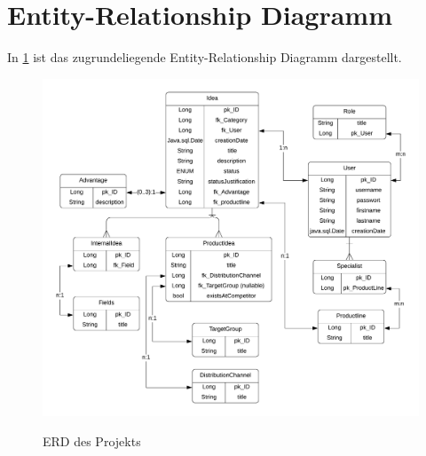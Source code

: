 

\section{Entity-Relationship Diagramm}

In \cref{fig:erd} ist das zugrundeliegende Entity-Relationship Diagramm dargestellt.

\begin{figure}[h!!]
    \centering
    \begin{minipage}[t]{1\textwidth}
        \caption{ERD des Projekts}
        \includegraphics[width=1\textwidth]{img/erd.png}\\
        \label{fig:erd}
    \end{minipage}
\end{figure}

